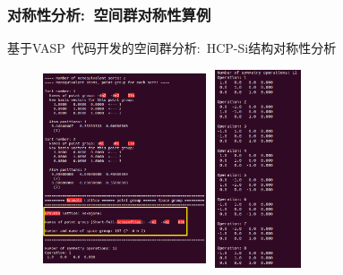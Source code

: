 \documentclass[cjk,slidestop,handout,compress,mathserif,blue]{beamer}	%
\begin{document}
\frame
{
	\frametitle{对称性分析:~空间群对称性算例}
	基于\textrm{VASP~}代码开发的空间群分析:~\textrm{HCP-Si}结构对称性分析
\begin{figure}[h!]
\centering
\includegraphics[height=2.3in,width=1.9in,viewport=0 0 520 600,clip]{Figures/HCP_Si_Symm-3.png}
\hspace*{0.01in}
\includegraphics[height=2.3in,width=1.1in,viewport=0 0 270 560,clip]{Figures/HCP_Si_Symm-4.png}
\caption{\fontsize{7.2pt}{4.2pt}}
\label{Space_Group_Analysis}
\end{figure} 
}
\end{document}
